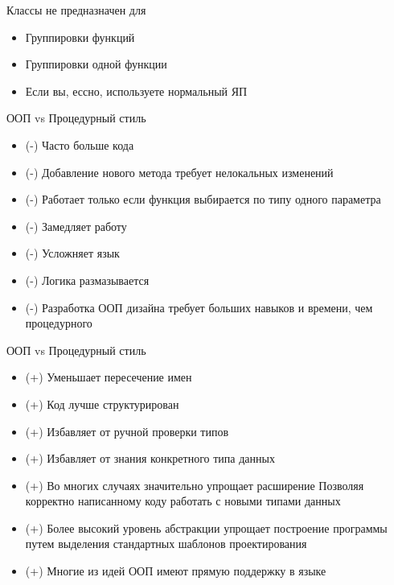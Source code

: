\documentclass{article}
\begin{document}
\begin{center} Классы не предназначен для \end{center}
\begin{itemize}
    \item Группировки функций
    \item Группировки одной функции
    \item Если вы, ессно, используете нормальный ЯП
\end{itemize}
\newpage

\begin{center} ООП vs Процедурный стиль \end{center}
\begin{itemize}
    \item (-) Часто больше кода
    \item (-) Добавление нового метода требует нелокальных изменений
    \item (-) Работает только если функция выбирается по типу одного параметра
    \item (-) Замедляет работу
    \item (-) Усложняет язык
    \item (-) Логика размазывается
    \item (-) Разработка ООП дизайна требует больших навыков и времени, чем процедурного
\end{itemize}
\newpage

\begin{center} ООП vs Процедурный стиль \end{center}
\begin{itemize}
    \item (+) Уменьшает пересечение имен
    \item (+) Код лучше структурирован
    \item (+) Избавляет от ручной проверки типов
    \item (+) Избавляет от знания конкретного типа данных
    \item (+) Во многих случаях значительно упрощает расширение
              Позволяя корректно написанному коду работать с новыми типами данных
    \item (+) Более высокий уровень абстракции упрощает построение программы
              путем выделения стандартных шаблонов проектирования
    \item (+) Многие из идей ООП имеют прямую поддержку в языке
\end{itemize}
\newpage
\end{document}

